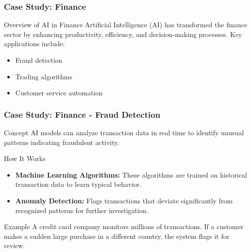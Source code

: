 \documentclass[aspectratio=169]{beamer}
\begin{document}
\begin{frame}[fragile]
    \frametitle{Case Study: Finance}
    \begin{block}{Overview of AI in Finance}
        Artificial Intelligence (AI) has transformed the finance sector by enhancing productivity, efficiency, and decision-making processes. Key applications include:
        \begin{itemize}
            \item Fraud detection
            \item Trading algorithms
            \item Customer service automation
        \end{itemize}
    \end{block}
\end{frame}

\begin{frame}[fragile]
    \frametitle{Case Study: Finance - Fraud Detection}
    \begin{block}{Concept}
        AI models can analyze transaction data in real time to identify unusual patterns indicating fraudulent activity.
    \end{block}
    
    \begin{block}{How It Works}
        \begin{itemize}
            \item \textbf{Machine Learning Algorithms:} These algorithms are trained on historical transaction data to learn typical behavior.
            \item \textbf{Anomaly Detection:} Flags transactions that deviate significantly from recognized patterns for further investigation.
        \end{itemize}
    \end{block}
    
    \begin{exampleblock}{Example}
        A credit card company monitors millions of transactions. If a customer makes a sudden large purchase in a different country, the system flags it for review.
    \end{exampleblock}
\end{frame}
\end{document}
